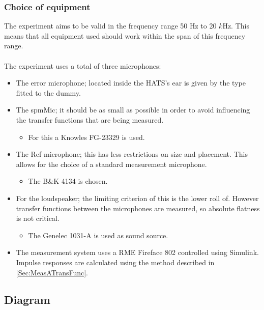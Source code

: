 \subsubsection{Choice of equipment}
The experiment aims to be valid in the frequency range 50 Hz to 20 $k$Hz. This means that all equipment used should work within the span of this frequency range. \\\\
The experiment uses a total of three microphones:
\begin{itemize}
	\item The error microphone; located inside the HATS's ear is given by the type fitted to the dummy.
	\item The spmMic; it should be as small as possible in order to avoid influencing the transfer functions that are being measured.
	\begin{itemize}
		\item For this a Knowles FG-23329 is used.
	\end{itemize}
	\item The Ref microphone; this has less restrictions on size and placement. This allows for the choice of a standard measurement microphone.
	\begin{itemize}
		\item The B\&K 4134 is chosen.
	\end{itemize}
	\item For the loudspeaker; the limiting criterion of this is the lower roll of. However transfer functions between the microphones are measured, so absolute flatness is not critical.
	\begin{itemize}
		\item The Genelec 1031-A is used as sound source.
	\end{itemize}
	\item The measurement system uses a RME Fireface 802 controlled using Simulink. Impulse responses are calculated using the method described in \autoref{Sec:MeasATransFunc}. 
\end{itemize}

\subsection{Diagram}

